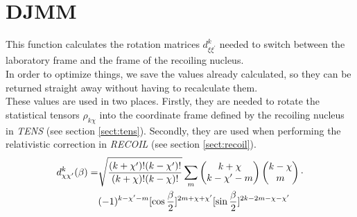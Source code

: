 \section{DJMM}
\label{sect:djmm}

\noindent This function calculates the rotation matrices $d^k_{\xi
\xi^\prime}$ needed to switch between the laboratory frame and the frame of
the recoiling nucleus.\\

\noindent In order to optimize things, we save the values already
calculated, so they can be returned straight away without having to
recalculate them.\\

\noindent These values are used in two places. Firstly, they are needed to
rotate the statistical tensors $\rho_{k \chi}$ into the coordinate frame
defined by the recoiling nucleus in {\em TENS} (see section
\ref{sect:tens}). Secondly, they are used when performing the relativistic
correction in {\em RECOIL} (see section \ref{sect:recoil}).\\

\begin{eqnarray}
d^k_{\chi \chi^\prime}(\beta) = &
\sqrt{{(k + \chi^\prime)! (k - \chi^\prime)! \over (k + \chi)! (k - \chi)!}}
\sum_m
\begin{pmatrix}
k + \chi\\
k - \chi^\prime - m
\end{pmatrix}
\begin{pmatrix}
k - \chi\\
m
\end{pmatrix}
\cdot\\
&
(-1)^{k - \chi^\prime - m}[\cos{\beta \over 2}]^{2m + \chi + \chi^\prime}
[\sin{\beta \over 2}]^{2k-2m - \chi - \chi^\prime}
\end{eqnarray}
